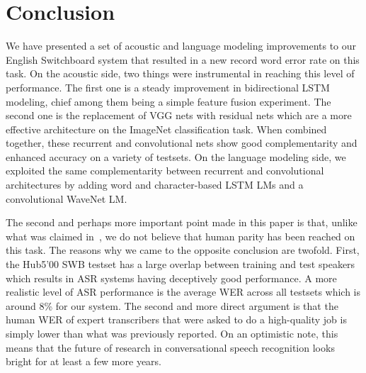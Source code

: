\documentclass[a4paper]{article}
\begin{document}
\section{Conclusion}
\label{conclusion}
We have presented a set of acoustic and language modeling improvements
to our English Switchboard system that resulted in a new record word
error rate on this task. On the acoustic side, two things were
instrumental in reaching this level of performance. The first one is a
steady improvement in bidirectional LSTM modeling, chief among them
being a simple feature fusion experiment. The second one is the
replacement of VGG nets with residual nets which are a more effective
architecture on the ImageNet classification task. When combined
together, these recurrent and convolutional nets show good
complementarity and enhanced accuracy on a variety of testsets. On the
language modeling side, we exploited the same complementarity between
recurrent and convolutional architectures by adding word and
character-based LSTM LMs and a convolutional WaveNet LM.

The second and perhaps more important point made in this paper is
that, unlike what was claimed in~\cite{xiong16}, we do not believe
that human parity has been reached on this task. The reasons why we
came to the opposite conclusion are twofold.  First, the Hub5'00 SWB
testset has a large overlap between training and test speakers which
results in ASR systems having deceptively good performance. A more
realistic level of ASR performance is the average WER across all
testsets which is around 8\% for our system. The second and more
direct argument is that the human WER of expert transcribers that were
asked to do a high-quality job is simply lower than what was
previously reported. On an optimistic note, this means that the future
of research in conversational speech recognition looks bright for at
least a few more years.



\end{document}
